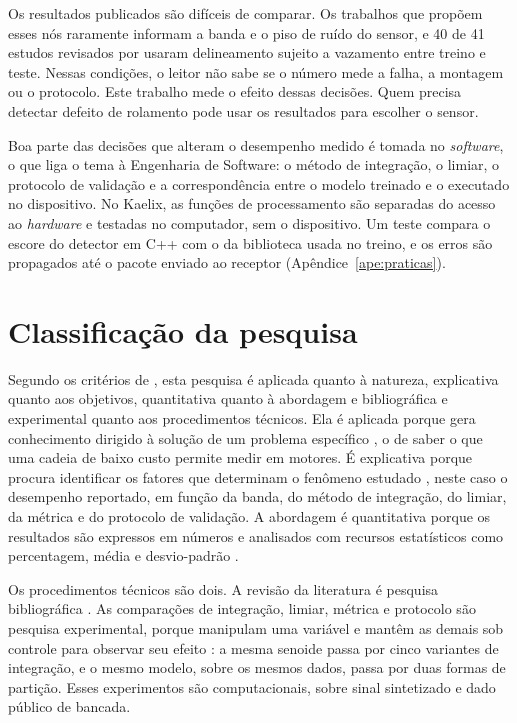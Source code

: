 Os resultados publicados são difíceis de comparar. Os trabalhos que propõem esses nós
raramente informam a banda e o piso de ruído do sensor, e \num{40} de \num{41} estudos
revisados por  usaram delineamento sujeito a vazamento entre treino
e teste. Nessas condições, o leitor não sabe se o número mede a falha, a montagem ou o
protocolo. Este trabalho mede o efeito dessas decisões. Quem precisa detectar defeito de
rolamento pode usar os resultados para escolher o sensor.

Boa parte das decisões que alteram o desempenho medido é tomada no \emph{software}, o que
liga o tema à Engenharia de Software: o método de integração, o limiar, o
protocolo de validação e a correspondência entre o modelo treinado e o executado no
dispositivo. No Kaelix, as funções de processamento são separadas do acesso ao
\emph{hardware} e testadas no computador, sem o dispositivo. Um teste compara o escore do
detector em C++ com o da biblioteca usada no treino, e os erros são propagados até o
pacote enviado ao receptor (Apêndice~\ref{ape:praticas}).

\section{Classificação da pesquisa}
\label{sec:intro-classificacao}

Segundo os critérios de , esta pesquisa é aplicada quanto à
natureza, explicativa quanto aos objetivos, quantitativa quanto à abordagem e
bibliográfica e experimental quanto aos procedimentos técnicos. Ela é aplicada porque gera
conhecimento dirigido à solução de um problema específico \cite[p.~51]{prodanov2013}, o de
saber o que uma cadeia de baixo custo permite medir em motores. É explicativa porque
procura identificar os fatores que determinam o fenômeno estudado
\cite[p.~53]{prodanov2013}, neste caso o desempenho reportado, em função da banda, do
método de integração, do limiar, da métrica e do protocolo de validação. A abordagem é
quantitativa porque os resultados são expressos em números e analisados com recursos
estatísticos como percentagem, média e desvio-padrão \cite[p.~69]{prodanov2013}.

Os procedimentos técnicos são dois. A revisão da literatura é pesquisa bibliográfica
\cite[p.~54]{prodanov2013}. As comparações de integração, limiar, métrica e protocolo são
pesquisa experimental, porque manipulam uma variável e mantêm as demais sob controle para
observar seu efeito \cite[p.~57]{prodanov2013}: a mesma senoide passa por cinco variantes
de integração, e o mesmo modelo, sobre os mesmos dados, passa por duas formas de partição.
Esses experimentos são computacionais, sobre sinal sintetizado e dado público de bancada.

